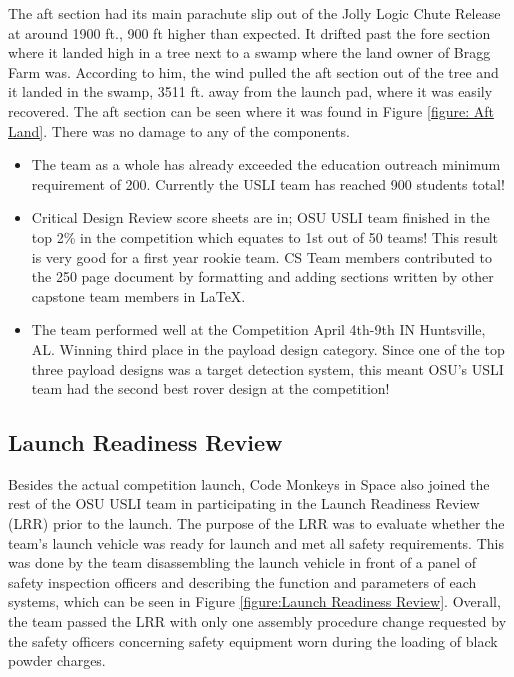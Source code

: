 \documentclass[onecolumn, draftclsnofoot, 10pt, compsoc]{IEEEtran}
\begin{document}
The aft section had its main parachute slip out of the Jolly Logic Chute Release at around 1900 ft., 900 ft higher than expected. It drifted past the fore section where it landed high in a tree next to a swamp where the land owner of Bragg Farm was. According to him, the wind pulled the aft section out of the tree and it landed in the swamp, 3511 ft. away from the launch pad, where it was easily recovered. The aft section can be seen where it was found in Figure \ref{figure: Aft Land}. There was no damage to any of the components.

\begin{itemize}
\item The team as a whole has already exceeded the
education outreach minimum requirement of 200.
Currently the USLI team has reached 900 students total!

\item Critical Design Review score sheets are in; OSU USLI
team finished in the top 2\% in the competition which
equates to 1st out of 50 teams! This result is very good
for a first year rookie team. CS Team members
contributed to the 250 page document by formatting and
adding sections written by other capstone team
members in \LaTeX.

\item The team performed well at the Competition April 4th-9th IN Huntsville, AL. Winning third place in the payload design category. Since one of the top three payload designs was a target detection system, this meant OSU's USLI team had the second best rover design at the competition!
\end{itemize}

\subsection{Launch Readiness Review}
Besides the actual competition launch, Code Monkeys in Space also joined the rest of the OSU USLI team in participating in the Launch Readiness Review (LRR) prior to the launch. The purpose of the LRR was to evaluate whether the team's launch vehicle was ready for launch and met all safety requirements. This was done by the team disassembling the launch vehicle in front of a panel of safety inspection officers and describing the function and parameters of each systems, which can be seen in Figure \ref{figure:Launch Readiness Review}. Overall, the team passed the LRR with only one assembly procedure change requested by the safety officers concerning safety equipment worn during the loading of black powder charges.
\end{document}
